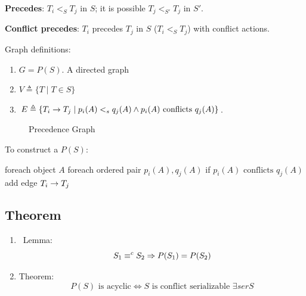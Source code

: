 \documentclass[a4paper]{report}
\begin{document}
\textbf{Precedes}: $T_i <_S T_j$ in $S$; it is possible $T_j <_{S'} T_j$ in $S'$.

\textbf{Conflict precedes}: $T_i$ precedes $T_j$ in $S$ ($T_i <_S T_j$) with conflict actions. 

Graph definitions: 
\begin{enumerate}
\item $G = P(S)$. A directed graph 
\item $V \triangleq \{T\mid T\in S\}$
\item $E \triangleq \{T_i \rightarrow T_j\mid p_i(A) <_s q_j(A) \wedge p_i(A)  \text{ conflicts } q_j(A)\}$. 
\end{enumerate}
\begin{figure}[hbtp]
\centering
{}
\caption{Precedence Graph}
\label{fig:precdnGraph}
\end{figure}
To construct a $P(S)$:
\begin{pseudo}
foreach object $A$
  foreach ordered pair $p_i(A), q_j(A)$
    if $p_i(A) \text{ conflicts } q_j(A)$
      add edge $T_i \rightarrow T_j$
\end{pseudo}
\subsection{Theorem}
\begin{enumerate}
\item\ Lemma: 
$$S_1 \equiv^c S_2 \Rightarrow P(S_1)=P(S_2)$$
\item Theorem:
$$P(S) \text{ is acyclic} \Leftrightarrow S \text{ is conflict serializable } \exists serS$$
\end{enumerate}
\end{document}
